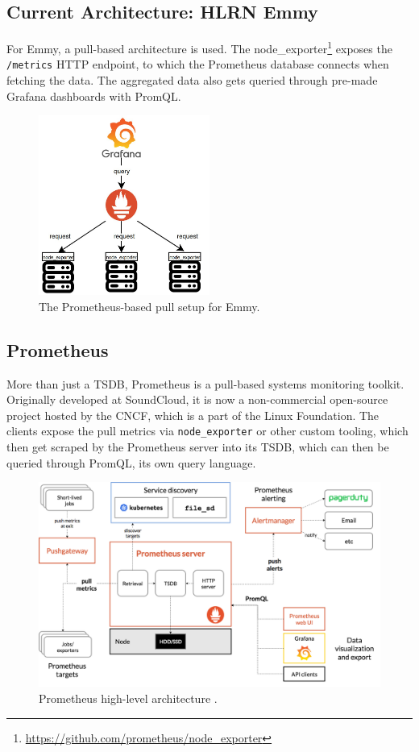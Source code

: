 \subsection{Current Architecture: HLRN Emmy}
For Emmy, a pull-based architecture is used. The node\_exporter\footnote{
\url{https://github.com/prometheus/node_exporter}} exposes the \texttt{/metrics} HTTP endpoint, to which
the Prometheus database connects when fetching the data. The aggregated data also gets queried
through pre-made Grafana dashboards with PromQL.

\begin{figure}[H]
  \centering
  \includegraphics[width=0.5\textwidth]{./assets/prometheus.jpeg}
  \caption{The Prometheus-based pull setup for Emmy.}
\end{figure}

\subsection{Prometheus}
More than just a \ac{TSDB}, Prometheus is a pull-based systems monitoring toolkit. Originally 
developed at SoundCloud, it is now a non-commercial open-source project hosted by the \ac{CNCF},
which is a part of the Linux Foundation. The clients expose the pull metrics via \texttt{node\_exporter} or other custom tooling,
which then get scraped by the Prometheus server into its \ac{TSDB}, which can then be queried through
PromQL, its own query language.

\begin{figure}[H]
  \centering
  \includegraphics[width=\textwidth]{./assets/promarch.png}
  \caption{Prometheus high-level architecture \cite{promarch}.}
\end{figure}

